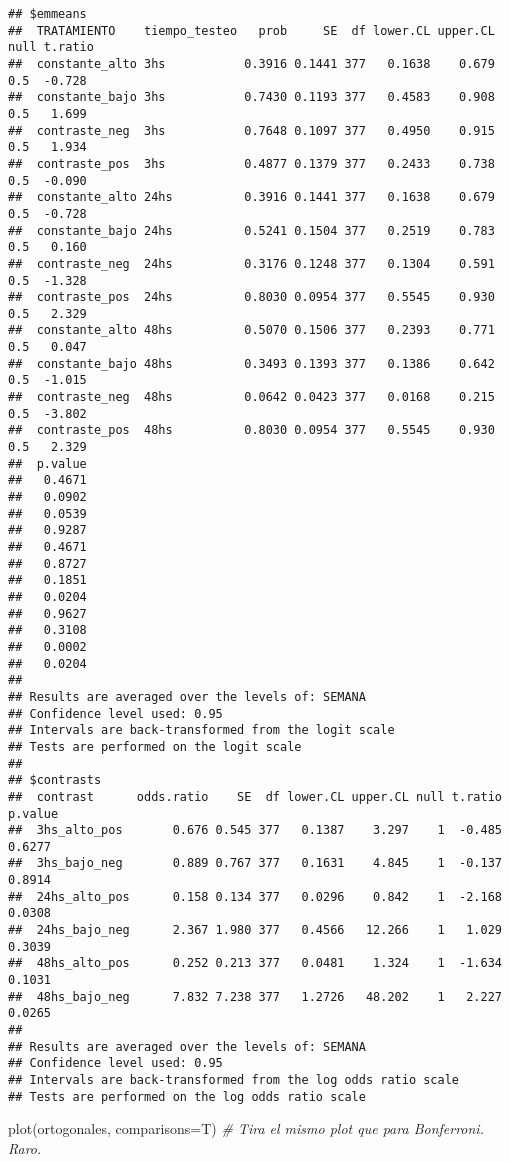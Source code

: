\documentclass[
]{article}
\newenvironment{Shaded}{\begin{snugshade}}{\end{snugshade}}
\newcommand{\AttributeTok}[1]{\textcolor[rgb]{0.77,0.63,0.00}{#1}}
\newcommand{\CommentTok}[1]{\textcolor[rgb]{0.56,0.35,0.01}{\textit{#1}}}
\newcommand{\FunctionTok}[1]{\textcolor[rgb]{0.00,0.00,0.00}{#1}}
\newcommand{\NormalTok}[1]{#1}
\begin{document}
\begin{verbatim}
## $emmeans
##  TRATAMIENTO    tiempo_testeo   prob     SE  df lower.CL upper.CL null t.ratio
##  constante_alto 3hs           0.3916 0.1441 377   0.1638    0.679  0.5  -0.728
##  constante_bajo 3hs           0.7430 0.1193 377   0.4583    0.908  0.5   1.699
##  contraste_neg  3hs           0.7648 0.1097 377   0.4950    0.915  0.5   1.934
##  contraste_pos  3hs           0.4877 0.1379 377   0.2433    0.738  0.5  -0.090
##  constante_alto 24hs          0.3916 0.1441 377   0.1638    0.679  0.5  -0.728
##  constante_bajo 24hs          0.5241 0.1504 377   0.2519    0.783  0.5   0.160
##  contraste_neg  24hs          0.3176 0.1248 377   0.1304    0.591  0.5  -1.328
##  contraste_pos  24hs          0.8030 0.0954 377   0.5545    0.930  0.5   2.329
##  constante_alto 48hs          0.5070 0.1506 377   0.2393    0.771  0.5   0.047
##  constante_bajo 48hs          0.3493 0.1393 377   0.1386    0.642  0.5  -1.015
##  contraste_neg  48hs          0.0642 0.0423 377   0.0168    0.215  0.5  -3.802
##  contraste_pos  48hs          0.8030 0.0954 377   0.5545    0.930  0.5   2.329
##  p.value
##   0.4671
##   0.0902
##   0.0539
##   0.9287
##   0.4671
##   0.8727
##   0.1851
##   0.0204
##   0.9627
##   0.3108
##   0.0002
##   0.0204
## 
## Results are averaged over the levels of: SEMANA 
## Confidence level used: 0.95 
## Intervals are back-transformed from the logit scale 
## Tests are performed on the logit scale 
## 
## $contrasts
##  contrast      odds.ratio    SE  df lower.CL upper.CL null t.ratio p.value
##  3hs_alto_pos       0.676 0.545 377   0.1387    3.297    1  -0.485  0.6277
##  3hs_bajo_neg       0.889 0.767 377   0.1631    4.845    1  -0.137  0.8914
##  24hs_alto_pos      0.158 0.134 377   0.0296    0.842    1  -2.168  0.0308
##  24hs_bajo_neg      2.367 1.980 377   0.4566   12.266    1   1.029  0.3039
##  48hs_alto_pos      0.252 0.213 377   0.0481    1.324    1  -1.634  0.1031
##  48hs_bajo_neg      7.832 7.238 377   1.2726   48.202    1   2.227  0.0265
## 
## Results are averaged over the levels of: SEMANA 
## Confidence level used: 0.95 
## Intervals are back-transformed from the log odds ratio scale 
## Tests are performed on the log odds ratio scale
\end{verbatim}

\begin{Shaded}
\begin{Highlighting}[]
\FunctionTok{plot}\NormalTok{(ortogonales, }\AttributeTok{comparisons=}\NormalTok{T) }\CommentTok{\# Tira el mismo plot que para Bonferroni. Raro.}
\end{Highlighting}
\end{Shaded}
\end{document}
